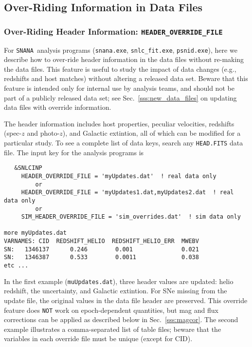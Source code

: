 \documentclass[12pt]{article}
\newcommand{\snana}{{\tt SNANA}}
\begin{document}
\clearpage
\subsection{Over-Riding Information in Data Files}
\label{subsec:data_override}


\subsubsection{Over-Riding Header Information: {\tt HEADER\_OVERRIDE\_FILE} }
\label{sss:header_override}

For \snana\ analysis programs 
({\tt snana.exe}, {\tt snlc\_fit.exe}, {\tt psnid.exe}),
here we describe how to over-ride header information in the
data files without re-making the data files.
This feature is useful to study the impact of data changes
(e.g., redshifts and host matches) without altering a released
data set. Beware that this feature is intended only for internal 
use by analysis teams,
and should not be part of a publicly released data set;
see Sec.~\ref{sss:new_data_files} on updating data files with 
override information.

The header information includes host properties, peculiar
velocities, redshifts (spec-$z$ and photo-$z$), 
and Galactic extintion, all of which can be modified for a particular study. 
To see a complete list of data keys, search any {\tt *HEAD.FITS} data file.
The input key for the analysis programs is
\begin{verbatim}
   &SNLCINP
     HEADER_OVERRIDE_FILE = 'myUpdates.dat'  ! real data only
         or
     HEADER_OVERRIDE_FILE = 'myUpdates1.dat,myUpdates2.dat  ! real data only
         or
     SIM_HEADER_OVERRIDE_FILE = 'sim_overrides.dat'  ! sim data only

more myUpdates.dat
VARNAMES: CID  REDSHIFT_HELIO  REDSHIFT_HELIO_ERR  MWEBV
SN:   1346137      0.246        0.001              0.021
SN:   1346387      0.533        0.0011             0.038
etc ...
\end{verbatim}
%

In the first example ({\tt muUpdates.dat}), three header values are updated:
helio redshift, the uncertainty, and Galactic extintion.
For SNe missing from the update file, the original values in the 
data file header are preserved. This override feature does {\tt NOT} work
on epoch-dependent quantities, but mag and flux corrections can
be applied as described below in Sec.~\ref{sss:magcor}.
The second example illustrates a comma-separated list of table files;
beware that the variables in each override file must be unique (except for CID).
\end{document}
